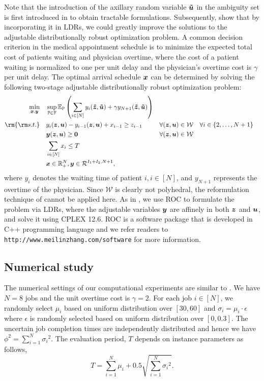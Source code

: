 \documentclass[fleqn,mnsc,blindrev]{informs4}
\newcommand{\mb}[1]{\mbox{\boldmath \ensuremath{#1}}}
\newcommand{\mbt}[1]{\mb{\tilde{#1}}}
\begin{document}
		Note that the introduction of the axillary random variable $\mbt{u}$ in the ambiguity set is first introduced in \cite{wks14} to obtain tractable formulations. Subsequently, \cite{bsz17} show that by incorporating it in LDRs, we could greatly improve the solutions to the adjustable distributionally robust optimization  problem. 
		A common decision criterion in the medical appointment schedule is to minimize the expected total cost of patients waiting and physician overtime, where the cost of a patient waiting is normalized to one per unit delay and the physician's overtime cost is $\gamma$ per unit delay. The optimal arrival schedule $\mb{x}$ can be determined by solving the following two-stage adjustable distributionally robust optimization problem:
\begin{equation}\label{mol:ApptScheduleELDRS}
			\begin{aligned}
				\min_{\boldsymbol{x}, \boldsymbol{y}} \quad & \sup_{\mathbb{P}\in \mathbb{F}}\mathbb{E}_\mathbb{P} \left(\sum_{i \in [N]}y_i(\mbt{z}, \mbt{u}) + \gamma y_{N+1}(\mbt{z}, \mbt{u})\right)  \\
				{\rm {\rm s.t.}}  \quad  & y_i(\mb{z}, \mb{u}) - y_{i-1}(\mb{z}, \mb{u}) + x_{i-1} \geq  {z}_{i-1} & \forall (\mb{z}, \mb{u})\in \mathcal{W} & \quad \forall i \in \{2,\dots ,N+1\} \\
				& \mb{y}(\mb{z}, \mb{u}) \geq \mb{0} &  \forall (\mb{z}, \mb{u})\in \mathcal{W}\\
				& \sum_{i \in [N]} x_i \leq T  \\
				& \mb{x} \in  \mathbb{R}^{N}_+, \mb{y} \in \mathcal{R}^{I_1+I_2, N+1},
			\end{aligned}
\end{equation}
		where $y_i$ denotes the waiting time of patient $i, i \in [N]$, and $y_{N+1}$ represents the overtime of the physician. Since $\mathcal{W}$ is clearly not polyhedral, the reformulation technique of \cite{bd16} cannot be applied here. As in \cite{bsz17}, we use ROC to formulate the problem via LDRs, where the adjustable variables $\mb{y}$ are affinely in both $\mb{z}$ and $\mb{u}$, and solve it using CPLEX 12.6. ROC is a software package that is developed in C++ programming language and we refer readers to \texttt{http://www.meilinzhang.com/software}  for more information.
		
		\subsection*{Numerical study}
		The numerical settings of our computational experiments are similar to \cite{bsz17}.
		We have $N=8$ jobs and the unit overtime cost is  $\gamma=2$.
		For each job $i\in[N]$, we  randomly select $\mu_{i}$ based on uniform distribution over $[30,60]$
		and $\sigma_i = \mu_i \cdot \epsilon$ where $\epsilon$ is randomly selected based on uniform distribution over $[0, 0.3]$.
		The uncertain job completion times are independently distributed and hence we have $ \phi^2 = \sum_{i=1}^{N} {\sigma_i}^2$.
		The evaluation period, $T$  depends on instance parameters as follows,
\begin{equation*}
		T = \sum_{i=1}^{N} \mu_i + 0.5 \sqrt{\sum_{i=1}^{N} {\sigma_i}^2}.
\end{equation*}
		
\end{document}
